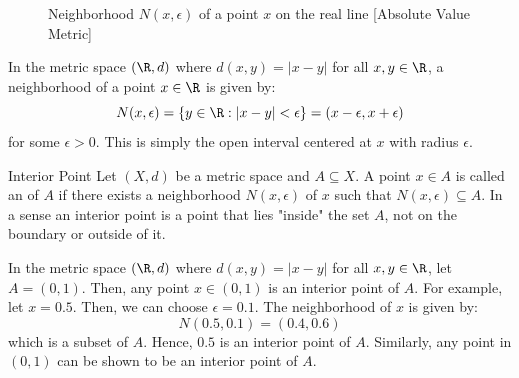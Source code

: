 \documentclass[openany]{book}
\begin{document}
\begin{figure}[H]
    \centering
    \caption{Neighborhood $N(x, \epsilon)$ of a point $x$ on the real line [Absolute Value Metric]}
\end{figure}
\begin{example}
    In the metric space $(\R, d)$ where $d(x, y) = |x - y|$ for all $x, y \in \R$, a neighborhood of a point $x \in \R$ is given by:
    $$N(x, \epsilon) = \{y \in \R: |x - y| < \epsilon\} = (x - \epsilon, x + \epsilon)$$
    for some $\epsilon > 0$. This is simply the open interval centered at $x$ with radius $\epsilon$. 
\end{example}
\begin{mydefinition}{Interior Point}
    Let $(X, d)$ be a metric space and $A \subseteq X$. A point $x \in A$ is called an  of $A$ if there exists a neighborhood $N(x, \epsilon)$ of $x$ such that $N(x, \epsilon) \subseteq A$.
    In a sense an interior point is a point that lies "inside" the set $A$, not on the boundary or outside of it.
\end{mydefinition}
\begin{example}
    In the metric space $(\R, d)$ where $d(x, y) = |x - y|$ for all $x, y \in \R$, let $A = (0, 1)$. Then, any point $x \in (0, 1)$ is an interior point of $A$. For example, let $x = 0.5$. Then, we can choose $\epsilon = 0.1$. The neighborhood of $x$ is given by:
    $$N(0.5, 0.1) = (0.4, 0.6)$$
    which is a subset of $A$. Hence, $0.5$ is an interior point of $A$. Similarly, any point in $(0, 1)$ can be shown to be an interior point of $A$.
\end{example}
\end{document}
